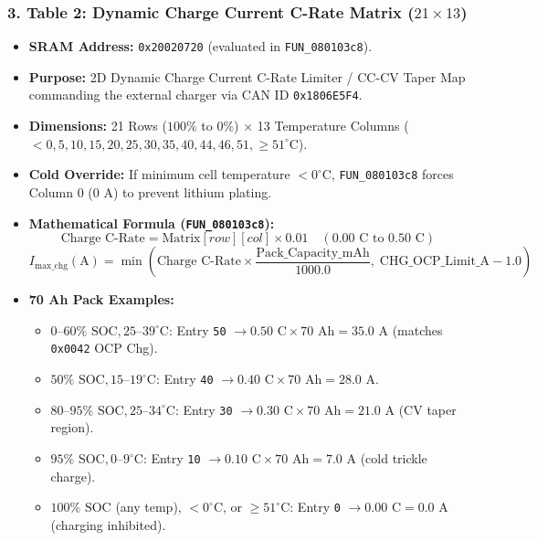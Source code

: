 \documentclass[10pt,a4paper]{article}
\begin{document}
\subsubsection{3. Table 2: Dynamic Charge Current C-Rate Matrix ($21 \times 13$)}
\begin{itemize}
    \item \textbf{SRAM Address:} \texttt{0x20020720} (evaluated in \texttt{FUN\_080103c8}).
    \item \textbf{Purpose:} 2D Dynamic Charge Current C-Rate Limiter / CC-CV Taper Map commanding the external charger via CAN ID \texttt{0x1806E5F4}.
    \item \textbf{Dimensions:} 21 Rows ($100\%$ to $0\%$) $\times$ 13 Temperature Columns ($<0, 5, 10, 15, 20, 25, 30, 35, 40, 44, 46, 51, \ge 51^\circ\text{C}$).
    \item \textbf{Cold Override:} If minimum cell temperature $<0^\circ\text{C}$, \texttt{FUN\_080103c8} forces Column 0 ($0\text{ A}$) to prevent lithium plating.
    \item \textbf{Mathematical Formula (\texttt{FUN\_080103c8}):}
    \begin{equation}
        \text{Charge C-Rate} = \text{Matrix}[row][col] \times 0.01 \quad (0.00\text{ C to }0.50\text{ C})
    \end{equation}
    \begin{equation}
        I_{\text{max\_chg}} (\text{A}) = \min\!\left(\text{Charge C-Rate} \times \frac{\text{Pack\_Capacity\_mAh}}{1000.0},\; \text{CHG\_OCP\_Limit\_A} - 1.0\right)
    \end{equation}
    \item \textbf{70 Ah Pack Examples:}
    \begin{itemize}
        \item $0\text{--}60\%\text{ SOC}, 25\text{--}39^\circ\text{C}$: Entry \texttt{50} $\rightarrow 0.50\text{ C} \times 70\text{ Ah} = 35.0\text{ A}$ (matches \texttt{0x0042} OCP Chg).
        \item $50\%\text{ SOC}, 15\text{--}19^\circ\text{C}$: Entry \texttt{40} $\rightarrow 0.40\text{ C} \times 70\text{ Ah} = 28.0\text{ A}$.
        \item $80\text{--}95\%\text{ SOC}, 25\text{--}34^\circ\text{C}$: Entry \texttt{30} $\rightarrow 0.30\text{ C} \times 70\text{ Ah} = 21.0\text{ A}$ (CV taper region).
        \item $95\%\text{ SOC}, 0\text{--}9^\circ\text{C}$: Entry \texttt{10} $\rightarrow 0.10\text{ C} \times 70\text{ Ah} = 7.0\text{ A}$ (cold trickle charge).
        \item $100\%\text{ SOC}$ (any temp), $<0^\circ\text{C}$, or $\ge 51^\circ\text{C}$: Entry \texttt{0} $\rightarrow 0.00\text{ C} = 0.0\text{ A}$ (charging inhibited).
    \end{itemize}
\end{itemize}
\end{document}
